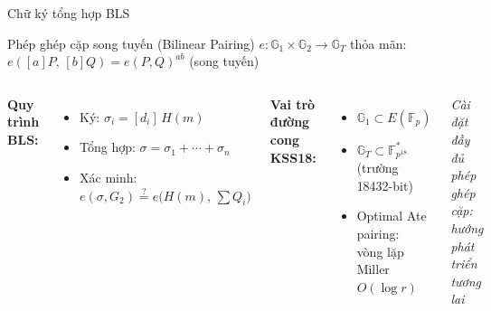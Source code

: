 \begin{frame}{Chữ ký tổng hợp BLS}
  \begin{block}{Phép ghép cặp song tuyến (Bilinear Pairing)}
    $e: \mathbb{G}_1 \times \mathbb{G}_2 \to \mathbb{G}_T$ thỏa mãn:\\
    $e([a]P,\, [b]Q) = e(P, Q)^{ab}$ \quad (song tuyến)
  \end{block}
  \vspace{0.3em}
  \begin{columns}[t]
      \textbf{Quy trình BLS:}
      \begin{itemize}
        \item Ký: $\sigma_i = [d_i]\, H(m)$
        \item Tổng hợp: $\sigma = \sigma_1 + \cdots + \sigma_n$
        \item Xác minh:\\
              $e(\sigma, G_2) \stackrel{?}{=} e\bigl(H(m),\, \sum Q_i\bigr)$
      \end{itemize}
      \textbf{Vai trò đường cong KSS18:}
      \begin{itemize}
        \item $\mathbb{G}_1 \subset E(\mathbb{F}_p)$
        \item $\mathbb{G}_T \subset \mathbb{F}_{p^{18}}^*$\\
              (trường 18432-bit)
        \item Optimal Ate pairing:\\
              vòng lặp Miller $O(\log r)$
      \end{itemize}
      \vspace{0.3em}
      \textit{Cài đặt đầy đủ phép ghép cặp: hướng phát triển tương lai}
  \end{columns}
\end{frame}
